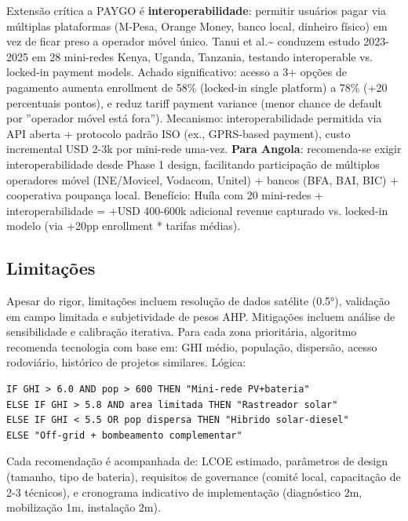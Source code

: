 \documentclass[12pt, a4paper]{article}
\begin{document}
Extensão crítica a PAYGO é
\textbf{interoperabilidade}: permitir usuários pagar via múltiplas plataformas (M-Pesa, Orange Money, banco local, dinheiro físico) em vez de ficar preso a operador móvel único. Tanui et al.\textasciitilde{}\citep{Tanui2024} conduzem estudo 2023-2025 em 28 mini-redes Kenya, Uganda, Tanzania, testando interoperable vs. locked-in payment models. Achado significativo: acesso a 3+ opções de pagamento aumenta enrollment de 58\% (locked-in single platform) a 78\% (+20 percentuais pontos), e reduz tariff payment variance (menor chance de default por ''operador móvel está fora''). Mecanismo: interoperabilidade permitida via API aberta + protocolo padrão ISO (ex., GPRS-based payment), custo incremental USD 2-3k por mini-rede uma-vez. 
\textbf{Para Angola}: recomenda-se exigir interoperabilidade desde Phase 1 design, facilitando participação de múltiplos operadores móvel (INE/Movicel, Vodacom, Unitel) + bancos (BFA, BAI, BIC) + cooperativa poupança local. Benefício: Huíla com 20 mini-redes + interoperabilidade = +USD 400-600k adicional revenue capturado vs. locked-in modelo (via +20pp enrollment * tarifas médias).

\subsection{Limitações}

Apesar do rigor, limitações incluem resolução de dados satélite (0.5°), validação em campo limitada e subjetividade de pesos AHP. Mitigações incluem análise de sensibilidade e calibração iterativa.
Para cada zona prioritária, algoritmo recomenda tecnologia com base em: GHI médio, população, dispersão, acesso rodoviário, histórico de projetos similares. Lógica:

\begin{lstlisting}[language={}]
IF GHI > 6.0 AND pop > 600 THEN "Mini-rede PV+bateria"
ELSE IF GHI > 5.8 AND area limitada THEN "Rastreador solar"
ELSE IF GHI < 5.5 OR pop dispersa THEN "Hibrido solar-diesel"
ELSE "Off-grid + bombeamento complementar"
\end{lstlisting}


Cada recomendação é acompanhada de: LCOE estimado, parâmetros de design (tamanho, tipo de bateria), requisitos de governance (comité local, capacitação de 2-3 técnicos), e cronograma indicativo de implementação (diagnóstico 2m, mobilização 1m, instalação 2m).


\end{document}
